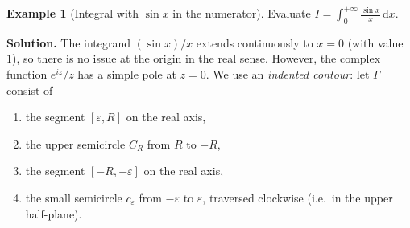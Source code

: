 \documentclass[12pt,a4paper,openany]{book}
\theoremstyle{definition}
\newtheorem{example}[definition]{Example}
\theoremstyle{plain}
\theoremstyle{remark}
\DeclareMathOperator{\re}{Re}
\DeclareMathOperator{\im}{Im}
\newcommand{\dd}{\mathrm{d}}
\begin{document}
\begin{example}[Integral with $\sin x$ in the numerator]\label{ex:fourier-2}
Evaluate $\displaystyle I=\int_{0}^{+\infty}\frac{\sin x}{x}\,\dd x$.

\medskip\noindent\textbf{Solution.}
The integrand $(\sin x)/x$ extends continuously to $x=0$ (with value~$1$),
so there is no issue at the origin in the real sense.  However, the
complex function $e^{iz}/z$ has a simple pole at $z=0$.  We use an
\emph{indented contour}: let $\Gamma$ consist of
\begin{enumerate}[label=(\roman*)]
  \item the segment $[\varepsilon,R]$ on the real axis,
  \item the upper semicircle $C_R$ from $R$ to $-R$,
  \item the segment $[-R,-\varepsilon]$ on the real axis,
  \item the small semicircle $c_\varepsilon$ from $-\varepsilon$ to
        $\varepsilon$, traversed clockwise (i.e.\ in the upper half-plane).
\end{enumerate}

\begin{center}
\end{center}


\end{example}
\end{document}
